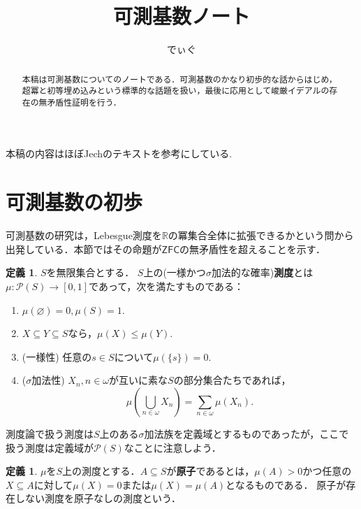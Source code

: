 \documentclass[uplatex]{jsarticle}
\title{可測基数ノート}
\author{でぃぐ}
\newcommand{\R}{\mathbb{R}}
\newcommand{\Pow}{\mathcal{P}}
\newcommand{\ZFC}{\mathsf{ZFC}}
\renewcommand\emptyset{\varnothing}
\renewcommand\subset{\subseteq}
\theoremstyle{definition}
\newtheorem{defi}[thm]{定義}
\begin{document}
	
	\maketitle
	
	\begin{abstract}
		本稿は可測基数についてのノートである．可測基数のかなり初歩的な話からはじめ，超冪と初等埋め込みという標準的な話題を扱い，最後に応用として峻厳イデアルの存在の無矛盾性証明を行う．
	\end{abstract}
	
	\tableofcontents
	
	\vspace{1cm}
	
	本稿の内容はほぼJechのテキスト\cite{jech2006set}を参考にしている.
	
	\section{可測基数の初歩}
	
	可測基数の研究は，Lebesgue測度を$\R$の冪集合全体に拡張できるかという問から出発している．本節ではその命題が$\ZFC$の無矛盾性を超えることを示す．
	
	\begin{defi}
		$S$を無限集合とする． $S$上の(一様かつ$\sigma$加法的な確率)\textbf{測度}とは$\mu \colon \Pow(S) \to [0, 1]$であって，次を満たすものである：
		\begin{enumerate}
			\item $\mu(\emptyset) = 0, \mu(S) = 1$.
			\item $X \subset Y \subset S$なら，$\mu(X) \le \mu(Y)$.
			\item (一様性) 任意の$s \in S$について$\mu(\{s\}) = 0$.
			\item ($\sigma$加法性) $X_n, n \in \omega$が互いに素な$S$の部分集合たちであれば，
			\[
			\mu\left(\bigcup_{n \in \omega} X_n\right) = \sum_{n \in \omega} \mu(X_n). 
			\]
		\end{enumerate}
	\end{defi}
	
	測度論で扱う測度は$S$上のある$\sigma$加法族を定義域とするものであったが，ここで扱う測度は定義域が$\Pow(S)$なことに注意しよう．
	
	\begin{defi}
		$\mu$を$S$上の測度とする．$A \subset S$が\textbf{原子}であるとは，$\mu(A) > 0$かつ任意の$X \subset A$に対して$\mu(X) = 0$または$\mu(X) = \mu(A)$となるものである．
		原子が存在しない測度を原子なしの測度という．
	\end{defi}
	
\end{document}
